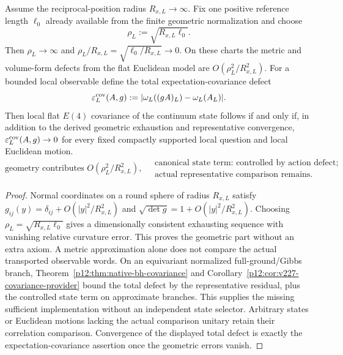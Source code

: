 \documentclass[12pt,a4paper]{article}
\begin{document}
\begin{lemma}
\label{p12:lem:tier2-flat-chart-covariance}
Assume the reciprocal-position radius \(R_{x,L}\to\infty\).  Fix one positive reference length \(\ell_0\) already available from the finite geometric normalization and choose
\[
\rho_L:=\sqrt{R_{x,L}\ell_0}.
\]
Then \(\rho_L\to\infty\) and \(\rho_L/R_{x,L}=\sqrt{\ell_0/R_{x,L}}\to0\).  On these charts the metric and volume-form defects from the flat Euclidean model are \(O(\rho_L^2/R_{x,L}^2)\).  For a bounded local observable define the total expectation-covariance defect
\[
\varepsilon^{\rm cov}_L(A,g)
:=|\omega_L((gA)_L)-\omega_L(A_L)|.
\]
Then local flat \(E(4)\) covariance of the continuum state follows if and only if, in addition to the derived geometric exhaustion and representative convergence, \(\varepsilon^{\rm cov}_L(A,g)\to0\) for every fixed compactly supported local question and local Euclidean motion.
\begin{equation}
\label{p12:eq:tier2-flat-chart-estimate}
\text{geometry contributes }O(\rho_L^2/R_{x,L}^2),\quad
\begin{gathered}\text{canonical state term: controlled by action defect;}\\\text{actual representative comparison remains.}\end{gathered}
\end{equation}
\end{lemma}
\begin{proof}
Normal coordinates on a round sphere of radius \(R_{x,L}\) satisfy \(g_{ij}(y)=\delta_{ij}+O(|y|^2/R_{x,L}^2)\) and \(\sqrt{\det g}=1+O(|y|^2/R_{x,L}^2)\).  Choosing \(\rho_L=\sqrt{R_{x,L}\ell_0}\) gives a dimensionally consistent exhausting sequence with vanishing relative curvature error.  This proves the geometric part without an extra axiom.  A metric approximation alone does not compare the actual transported observable words. On an equivariant normalized full-ground/Gibbs branch, Theorem~\ref{p12:thm:native-bh-covariance} and Corollary~\ref{p12:cor:v227-covariance-provider} bound the total defect by the representative residual, plus the controlled state term on approximate branches. This supplies the missing sufficient implementation without an independent state selector. Arbitrary states or Euclidean motions lacking the actual comparison unitary retain their correlation comparison. Convergence of the displayed total defect is exactly the expectation-covariance assertion once the geometric errors vanish.
\end{proof}
\end{document}

